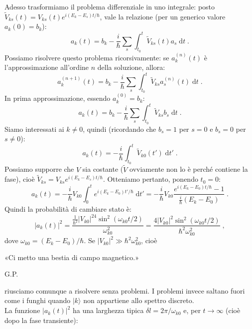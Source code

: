 \documentclass[12pt,a4paper]{report}
\theoremstyle{definition}
\numberwithin{equation}{section}
\newcommand{\diff}[1][]{\mathrm{d}#1}
\newcommand{\ket}{\rangle}
\begin{document}
Adesso trasformiamo il problema differenziale in uno integrale: posto $\tilde{V}_{ks}(t)=V_{ks}(t)e^{i(E_k-E_s)t/\hbar}$, vale la relazione (per un generico valore $a_k(0)=b_k$):
\begin{equation}
a_k(t)=b_k-\frac{i}{\hbar}\sum_s\int_{t_0}^t\tilde{V}_{ks}(t)a_s\;\diff{t}\;.
\end{equation}
Possiamo risolvere questo problema ricorsivamente: se $a_k^{(n)}(t)$ è l'approssimazione all'ordine $n$ della soluzione, allora:
\begin{equation}
a_k^{(n+1)}(t)=b_k-\frac{i}{\hbar}\sum_s\int_{t_0}^t\tilde{V}_{ks}a_s^{(n)}(t)\;\diff{t}\;.
\end{equation}
In prima approssimazione, essendo $a_k^{(0)}=b_k$:
\begin{equation}
a_k(t)=b_k-\frac{i}{\hbar}\sum_s\int_{t_0}^t \tilde{V}_{ks}b_s\;\diff{t}\;.
\end{equation}
Siamo interessati ai $k\ne 0$, quindi (ricordando che $b_s=1$ per $s=0$ e $b_s=0$ per $s\ne 0$):
\begin{equation}
a_k(t)=-\frac{i}{\hbar}\int_{t_0}^t \tilde{V}_{k0}(t')\;\diff{t'}\;.
\end{equation}
Possiamo supporre che $V$ sia costante ($\tilde{V}$ ovviamente non lo è perché contiene la fase), cioè $\tilde{V}_{ks}=V_{ks}e^{i(E_k-E_s)t/\hbar}$. Otteniamo pertanto, ponendo $t_0=0$:
\begin{equation}
a_k(t)=-\frac{i}{\hbar}V_{k0}\int_0^t e^{i(E_k-E_0)t'/\hbar}\;\diff{t'}=-\frac{i}{\hbar}V_{k0}\frac{e^{i(E_k-E_0)t/\hbar}-1}{\frac{i}{\hbar}(E_k-E_0)}\;.
\end{equation}
Quindi la probabilità di cambiare stato è:
\begin{equation}
|a_k(t)|^2=\frac{\frac{1}{\hbar^2}|V_{k0}|^24\sin^2(\omega_{k0}t/2)}{\omega_{k0}^2}=\frac{4|V_{k0}|^2\sin^2(\omega_{k0}t/2)}{\hbar^2\omega_{k0}^2}\;,
\end{equation}
dove $\omega_{k0}=(E_k-E_0)/\hbar$.
Se $|V_{k0}|^2\gg \hbar^2\omega_{k0}^2$, cioè
\begin{quoting}
«Ci metto una bestia di campo magnetico.»
\begin{flushright}
G.P.
\end{flushright}
\end{quoting}
riusciamo comunque a risolvere senza problemi. I problemi invece saltano fuori come i funghi quando $|k\ket$ non appartiene allo spettro discreto. \\
La funzione $|a_k(t)|^2$ ha una larghezza tipica $\delta l=2\pi/\omega_{k0}$ e, per $t\to\infty$ (cioè dopo la fase transiente):
\end{document}
